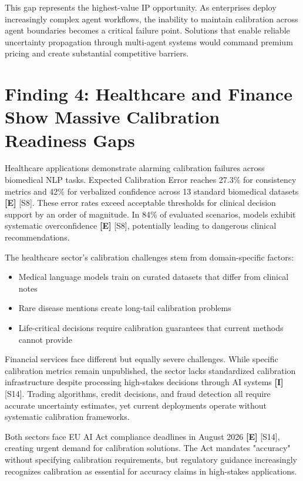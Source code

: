 \documentclass[a4paper,11pt]{article}
\newcommand{\elabel}{\textbf{\textcolor{ecolor}{[E]}}}
\newcommand{\ilabel}{\textbf{\textcolor{icolor}{[I]}}}
\begin{document}
This gap represents the highest-value IP opportunity. As enterprises deploy increasingly complex agent workflows, the inability to maintain calibration across agent boundaries becomes a critical failure point. Solutions that enable reliable uncertainty propagation through multi-agent systems would command premium pricing and create substantial competitive barriers.


\section{Finding 4: Healthcare and Finance Show Massive Calibration Readiness Gaps}

Healthcare applications demonstrate alarming calibration failures across biomedical NLP tasks. Expected Calibration Error reaches 27.3\% for consistency metrics and 42\% for verbalized confidence across 13 standard biomedical datasets \elabel{} \textcolor{primary}{[S8]}. These error rates exceed acceptable thresholds for clinical decision support by an order of magnitude. In 84\% of evaluated scenarios, models exhibit systematic overconfidence \elabel{} \textcolor{primary}{[S8]}, potentially leading to dangerous clinical recommendations.


The healthcare sector's calibration challenges stem from domain-specific factors:

\begin{itemize}
  \item Medical language models train on curated datasets that differ from clinical notes
  \item Rare disease mentions create long-tail calibration problems
  \item Life-critical decisions require calibration guarantees that current methods cannot provide
\end{itemize}

Financial services face different but equally severe challenges. While specific calibration metrics remain unpublished, the sector lacks standardized calibration infrastructure despite processing high-stakes decisions through AI systems \ilabel{} \textcolor{primary}{[S14]}. Trading algorithms, credit decisions, and fraud detection all require accurate uncertainty estimates, yet current deployments operate without systematic calibration frameworks.


Both sectors face EU AI Act compliance deadlines in August 2026 \elabel{} \textcolor{primary}{[S14]}, creating urgent demand for calibration solutions. The Act mandates "accuracy" without specifying calibration requirements, but regulatory guidance increasingly recognizes calibration as essential for accuracy claims in high-stakes applications.
\end{document}
